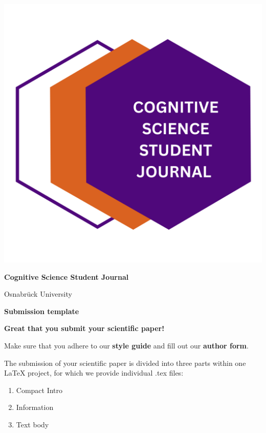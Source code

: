 \begin{titlepage}

\begin{minipage}{0.3\textwidth}
\includegraphics[width=1\textwidth]{images/CSSJ_logo.png}
\end{minipage} 
\hspace{0.02\linewidth}
\begin{minipage}{0.7\textwidth}
\LARGE\textbf{Cognitive Science Student Journal}

\LARGE{Osnabrück University}
\end{minipage}

\vspace{1cm}
\Huge\textbf{Submission template}

\vspace{1cm}
\begin{tcolorbox}[colback=cssj_purple!80!black ,colframe=cssj_purple!80!black]
\color{white}
\noindent \huge\textbf{Great that you submit your scientific paper!}

\vspace{0.6cm}
\noindent Make sure that you adhere to our \textbf{style guide} and fill out our \textbf{author form}.

\vspace{2cm}
\noindent The submission of your scientific paper is divided into three parts within one LaTeX project, for which we provide individual .tex files:
 \begin{enumerate}
    \item Compact Intro
    \item Information
    \item Text body
  \end{enumerate}
\end{tcolorbox}


\end{titlepage}